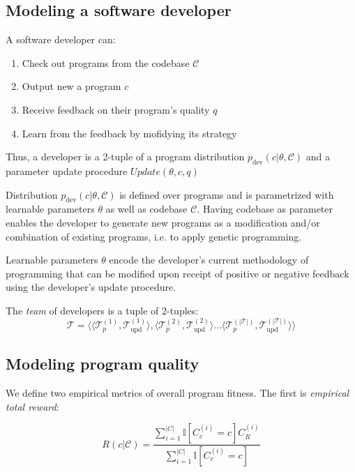 \subsection{Modeling a software developer}
\label{sec:developer}

A software developer can:
\begin{enumerate}
    \item Check out programs from the codebase $\mathcal{C}$
    \item Output new a program $c$
    \item Receive feedback on their program's quality $q$ 
    \item Learn from the feedback by mofidying its strategy
\end{enumerate}

Thus, a developer is a 2-tuple of a program distribution $p_\text{dev}(c | \theta, \mathcal{C})$ and a parameter update procedure $\mathit{Update}(\theta, c, q)$

Distribution $p_{\text{dev}}(c | \theta, \mathcal{C})$ is defined over programs and is parametrized with learnable parameters $\theta$ as well as codebase $\mathcal{C}$. 
Having codebase as parameter enables the developer to generate new programs as a modification and/or combination of existing programs, i.e. to apply genetic programming.

Learnable parameters $\theta$ encode the developer's current methodology of programming that can be modified upon receipt of positive or negative feedback using the developer's update procedure. 

The \emph{team} of developers is a tuple of 2-tuples:
\begin{equation}
    \mathcal{T} = \langle \langle \mathcal{T}_p^{(1)}, \mathcal{T}_\text{upd}^{(1)} \rangle, \langle \mathcal{T}_p^{(2)}, \mathcal{T}_\text{upd}^{(2)} \rangle \dots \langle \mathcal{T}_p^{(|\mathcal{T}|)}, \mathcal{T}_\text{upd}^{(|\mathcal{T}|)} \rangle \rangle
\end{equation}

\subsection{Modeling program quality}
\label{sec:quality}

We define two empirical metrics of overall program fitness.
The first is \emph{empirical total reward}:

\begin{equation}
    R(c|\mathcal{C}) = \frac{\sum\limits_{i=1}^{|C|} \mathbb{I}[C_c^{(i)}=c] C_R^{(i)}}{\sum\limits_{i=1}^{|C|} \mathbb{I}[C_c^{(i)}=c]}
\end{equation}

